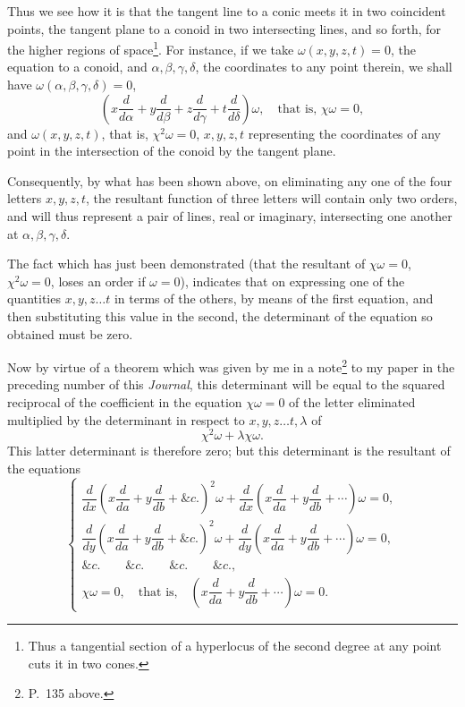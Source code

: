 \documentclass[11pt]{article}
\begin{document}
{{Thus we see how it is that the tangent line to a conic meets it in two coincident points, the tangent plane to a conoid in two intersecting lines, and so forth, for the higher regions of space\footnote{Thus a tangential section of a hyperlocus of the second degree at any point cuts it in two cones.}. For instance, if we take $\omega(x,y,z,t)=0$, the equation to a conoid, and $\alpha,\beta,\gamma,\delta$, the coordinates to any point therein, we shall have $\omega(\alpha,\beta,\gamma,\delta)=0$,
\[
 \left(x\frac{d}{d\alpha}+y\frac{d}{d\beta}+z\frac{d}{d\gamma}+t\frac{d}{d\delta}\right)\omega,
 \quad\text{that is, }\chi\omega=0,
\]
and $\omega(x,y,z,t)$, that is, $\chi^2\omega=0$, $x,y,z,t$ representing the coordinates of any point in the intersection of the conoid by the tangent plane.

Consequently, by what has been shown above, on eliminating any one of the four letters $x,y,z,t$, the resultant function of three letters will contain only two orders, and will thus represent a pair of lines, real or imaginary, intersecting one another at $\alpha,\beta,\gamma,\delta$.

The fact which has just been demonstrated (that the resultant of $\chi\omega=0$, $\chi^2\omega=0$, loses an order if $\omega=0$), indicates that on expressing one of the quantities $x,y,z\ldots t$ in terms of the others, by means of the first equation, and then substituting this value in the second, the determinant of the equation so obtained must be zero.

Now by virtue of a theorem which was given by me in a note\footnote{P.~135 above.} to my paper in the preceding number of this \emph{Journal}, this determinant will be equal to the squared reciprocal of the coefficient in the equation $\chi\omega=0$ of the letter eliminated multiplied by the determinant in respect to $x,y,z\ldots t,\lambda$ of
\[
 \chi^2\omega+\lambda\chi\omega.
\]
This latter determinant is therefore zero; but this determinant is the resultant of the equations
\[
\left\{\begin{array}{c}
\dfrac{d}{dx}\left(x\dfrac{d}{da}+y\dfrac{d}{db}+\&c.\right)^2\omega
+\dfrac{d}{dx}\left(x\dfrac{d}{da}+y\dfrac{d}{db}+\cdots\right)\omega=0,\\[0.8em]
\dfrac{d}{dy}\left(x\dfrac{d}{da}+y\dfrac{d}{db}+\&c.\right)^2\omega
+\dfrac{d}{dy}\left(x\dfrac{d}{da}+y\dfrac{d}{db}+\cdots\right)\omega=0,\\
\&c.\qquad\&c.\qquad\&c.\qquad\&c.,\\[0.5em]
\chi\omega=0,\quad\text{that is,}\quad \left(x\dfrac{d}{da}+y\dfrac{d}{db}+\cdots\right)\omega=0.
\end{array}\right.
\]

}}
\end{document}
